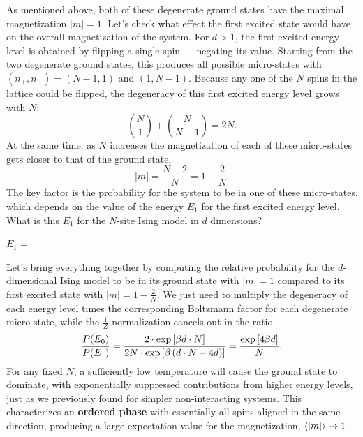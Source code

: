 As mentioned above, both of these degenerate ground states have the maximal magnetization $|m| = 1$.
Let's check what effect the first excited state would have on the overall magnetization of the system.
For $d > 1$, the first excited energy level is obtained by flipping a single spin --- negating its value.
Starting from the two degenerate ground states, this produces all possible micro-states with $(n_+, n_-) = (N - 1, 1)$ and $(1, N - 1)$.
Because any one of the $N$ spins in the lattice could be flipped, the degeneracy of this first excited energy level grows with $N$:
\begin{equation*}
  \binom{N}{1} + \binom{N}{N - 1} = 2N.
\end{equation*}
At the same time, as $N$ increases the magnetization of each of these micro-states gets closer to that of the ground state,
\begin{equation*}
  |m| = \frac{N - 2}{N} = 1 - \frac{2}{N}.
\end{equation*}
\newpage %
\noindent The key factor is the probability for the system to be in one of these micro-states, which depends on the value of the energy $E_1$ for the first excited energy level.
What is this $E_1$ for the $N$-site Ising model in $d$ dimensions?
\begin{mdframed}
  $\displaystyle E_1 = $ \\[100 pt]
\end{mdframed}

Let's bring everything together by computing the relative probability for the $d$-dimensional Ising model to be in its ground state with $|m| = 1$ compared to its first excited state with $|m| = 1 - \frac{2}{N}$.
We just need to multiply the degeneracy of each energy level times the corresponding Boltzmann factor for each degenerate micro-state, while the $\frac{1}{Z}$ normalization cancels out in the ratio
\begin{equation*}
  \frac{P(E_0)}{P(E_1)} = \frac{2\cdot \exp\left[\beta d\cdot N\right]}{2N\cdot \exp\left[\beta \left(d\cdot N - 4d\right)\right]} = \frac{\exp\left[4\beta d\right]}{N}.
\end{equation*}
For any fixed $N$, a sufficiently low temperature will cause the ground state to dominate, with exponentially suppressed contributions from higher energy levels, just as we previously found for simpler non-interacting systems.
This characterizes an \textbf{ordered phase} with essentially all spins aligned in the same direction, producing a large expectation value for the magnetization, $\left\langle |m| \right\rangle \to 1$.

